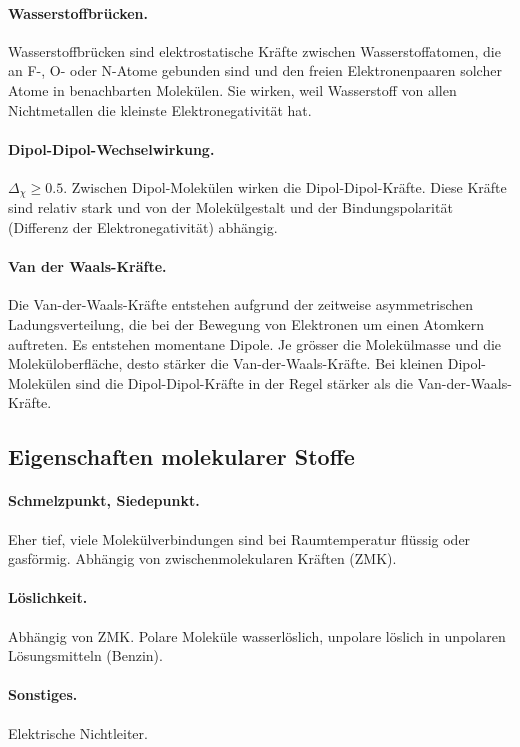 \paragraph{Wasserstoffbrücken.} 

Wasserstoffbrücken sind elektrostatische Kräfte zwischen Wasserstoffatomen, die an F-,
O- oder N-Atome gebunden sind und den freien Elektronenpaaren solcher Atome in benachbarten
Molekülen. Sie wirken, weil Wasserstoff von allen Nichtmetallen die kleinste
Elektronegativität hat.

\paragraph{Dipol-Dipol-Wechselwirkung.}

$\Delta_\chi \geqslant 0.5$. Zwischen Dipol-Molekülen wirken die Dipol-Dipol-Kräfte. Diese Kräfte sind relativ stark
und von der Molekülgestalt und der Bindungspolarität (Differenz der Elektronegativität)
abhängig.

\paragraph{Van der Waals-Kräfte.}

 Die Van-der-Waals-Kräfte entstehen aufgrund der zeitweise asymmetrischen Ladungsverteilung,
 die bei der Bewegung von Elektronen um einen Atomkern auftreten. Es entstehen
 momentane Dipole. Je grösser die Molekülmasse und die Moleküloberfläche, desto stärker
 die Van-der-Waals-Kräfte. Bei kleinen Dipol-Molekülen sind die Dipol-Dipol-Kräfte
 in der Regel stärker als die Van-der-Waals-Kräfte.


\subsection{Eigenschaften molekularer Stoffe}

\paragraph{Schmelzpunkt, Siedepunkt.}

Eher tief, viele Molekülverbindungen sind bei Raumtemperatur flüssig oder gasförmig. Abhängig von zwischenmolekularen Kräften (ZMK).

\paragraph{Löslichkeit.}

Abhängig von ZMK. Polare Moleküle wasserlöslich, unpolare löslich in unpolaren Lösungsmitteln (Benzin).

\paragraph{Sonstiges.}

Elektrische Nichtleiter.


